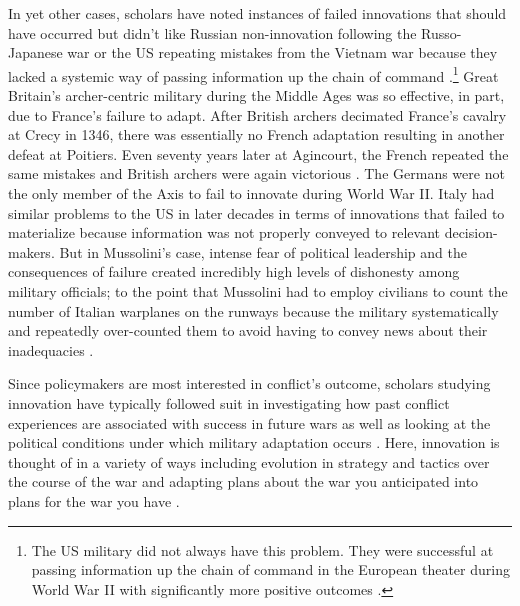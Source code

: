 \documentclass[12pt,letterpaper]{article}
\begin{document}
	In yet other cases, scholars have noted instances of failed innovations that should have occurred but didn't like Russian non-innovation following the Russo-Japanese war \citep[77-99]{bushnell_tsaristarmyrussojapanese_1982} or the US repeating mistakes from the Vietnam war because they lacked a systemic way of passing information up the chain of command \citep{lovell_vietnamarmylearning_1987, krepinevich_armyvietnam_1986, spector_tetbloodiestyear_1993, caverley_mythmilitarymyopia_2009}.\footnote{The US military did not always have this problem. They were successful at passing information up the chain of command in the European theater during World War II with significantly more positive outcomes \citep[3.47]{murray_militaryadaptationwar_2009}.} Great Britain's archer-centric military during the Middle Ages was so effective, in part, due to France's failure to adapt. After British archers decimated France's cavalry at Crecy in 1346, there was essentially no French adaptation resulting in another defeat at Poitiers. Even seventy years later at Agincourt, the French repeated the same mistakes and British archers were again victorious \citep[2.10]{murray_militaryadaptationwar_2009}. The Germans were not the only member of the Axis to fail to innovate during World War II. Italy had similar problems to the US in later decades in terms of innovations that failed to materialize because information was not properly conveyed to relevant decision-makers. But in Mussolini's case, intense fear of political leadership and the consequences of failure created incredibly high levels of dishonesty among military officials; to the point that Mussolini had to employ civilians to count the number of Italian warplanes on the runways because the military systematically and repeatedly over-counted them to avoid having to convey news about their inadequacies \citep[89]{millett_lessonswar_1988}.
	
	Since policymakers are most interested in conflict's outcome, scholars studying innovation have typically followed suit in investigating how past conflict experiences are associated with success in future wars \citep{quackenbush_wealwaysfight_2015} as well as looking at the political conditions under which military adaptation occurs \citep{harkness_militarymaladaptationcounterinsurgency_2015}. Here, innovation is thought of in a variety of ways including evolution in strategy and tactics over the course of the war \citep{rosen_winningnextwar_1991} and adapting plans about the war you anticipated into plans for the war you have \citep{kollars_warhorizonsoldierled_2015}.
\end{document}
